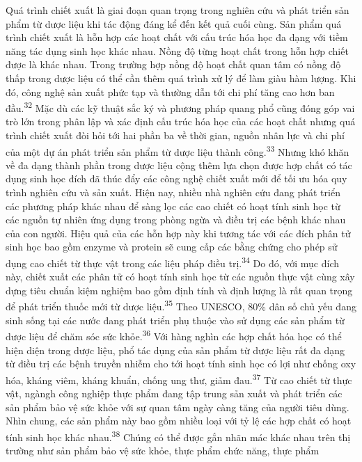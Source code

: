\documentclass[
  letterpaper,
  DIV=11,
  numbers=noendperiod]{scrartcl}
\begin{document}
Quá trình chiết xuất là giai đoạn quan trọng trong nghiên cứu và phát
triển sản phẩm từ dược liệu khi tác động đáng kể đến kết quả cuối cùng.
Sản phẩm quá trình chiết xuất là hỗn hợp các hoạt chất với cấu trúc hóa
học đa dạng với tiềm năng tác dụng sinh học khác nhau. Nồng độ từng hoạt
chất trong hỗn hợp chiết được là khác nhau. Trong trường hợp nồng độ
hoạt chất quan tâm có nồng độ thấp trong dược liệu có thể cần thêm quá
trình xử lý để làm giàu hàm lượng. Khi đó, công nghệ sản xuất phức tạp
và thường dẫn tới chi phí tăng cao hơn ban đầu.\textsuperscript{32} Mặc
dù các kỹ thuật sắc ký và phương pháp quang phổ cũng đóng góp vai trò
lớn trong phân lập và xác định cấu trúc hóa học của các hoạt chất nhưng
quá trình chiết xuất đòi hỏi tới hai phần ba về thời gian, nguồn nhân
lực và chi phí của một dự án phát triển sản phẩm từ dược liệu thành
công.\textsuperscript{33} Nhưng khó khăn về đa dạng thành phần trong
dược liệu cộng thêm lựa chọn được hợp chất có tác dụng sinh học đích đã
thúc đẩy các công nghệ chiết xuất mới để tối ưu hóa quy trình nghiên cứu
và sản xuất. Hiện nay, nhiều nhà nghiên cứu đang phát triển các phương
pháp khác nhau để sàng lọc các cao chiết có hoạt tính sinh học từ các
nguồn tự nhiên ứng dụng trong phòng ngừa và điều trị các bệnh khác nhau
của con người. Hiệu quả của các hỗn hợp này khi tương tác với các đích
phân tử sinh học bao gồm enzyme và protein sẽ cung cấp các bằng chứng
cho phép sử dụng cao chiết từ thực vật trong các liệu pháp điều
trị.\textsuperscript{34} Do đó, với mục đích này, chiết xuất các phân tử
có hoạt tính sinh học từ các nguồn thực vật cùng xây dựng tiêu chuẩn
kiệm nghiệm bao gồm định tính và định lượng là rất quan trọng để phát
triển thuốc mới từ dược liệu.\textsuperscript{35} Theo UNESCO, 80\% dân
số chủ yếu đang sinh sống tại các nước đang phát triển phụ thuộc vào sử
dụng các sản phẩm từ dược liệu để chăm sóc sức khỏe.\textsuperscript{36}
Với hàng nghìn các hợp chất hóa học có thể hiện diện trong dược liệu,
phổ tác dụng của sản phẩm từ dược liệu rất đa dạng từ điều trị các bệnh
truyền nhiễm cho tới hoạt tính sinh học có lợi như chống oxy hóa, kháng
viêm, kháng khuẩn, chống ung thư, giảm đau.\textsuperscript{37} Từ cao
chiết từ thực vật, ngàngh công nghiệp thực phẩm đang tập trung sản xuất
và phát triển các sản phẩm bảo vệ sức khỏe với sự quan tâm ngày càng
tăng của người tiêu dùng. Nhìn chung, các sản phẩm này bao gồm nhiều
loại với tỷ lệ các hợp chất có hoạt tính sinh học khác
nhau.\textsuperscript{38} Chúng có thể được gắn nhãn mác khác nhau trên
thị trường như sản phẩm bảo vệ sức khỏe, thực phẩm chức năng, thực phẩm
\end{document}
